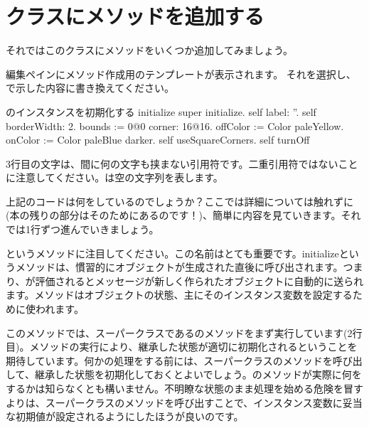 \documentclass[a4paper,10pt,twoside]{book}
\begin{document}
\section{クラスにメソッドを追加する}

それではこのクラスにメソッドをいくつか追加してみましょう。


編集ペインにメソッド作成用のテンプレートが表示されます。
それを選択し、で示した内容に書き換えてください。


\begin{numMethod}[scbecellinitialize]{のインスタンスを初期化する}
initialize
   super initialize.
   self label: ''.
   self borderWidth: 2.
   bounds := 0@0 corner: 16@16.
   offColor := Color paleYellow.
   onColor := Color paleBlue darker.
   self useSquareCorners.
   self turnOff
\end{numMethod}

\noindent
3行目の文字は、間に何の文字も挟まない引用符です。二重引用符ではないことに注意してください。は空の文字列を表します。


上記のコードは何をしているのでしょうか？ここでは詳細については触れずに(本の残りの部分はそのためにあるのです！)、簡単に内容を見ていきます。それでは1行ずつ進んでいきましょう。

というメソッドに注目してください。この名前はとても重要です。initializeというメソッドは、慣習的にオブジェクトが生成された直後に呼び出されます。つまり、が評価されるとメッセージが新しく作られたオブジェクトに自動的に送られます。メソッドはオブジェクトの状態、主にそのインスタンス変数を設定するために使われます。

このメソッドでは、スーパークラスであるのメソッドをまず実行しています(2行目)。メソッドの実行により、継承した状態が適切に初期化されるということを期待しています。何かの処理をする前には、スーパークラスのメソッドを呼び出して、継承した状態を初期化しておくとよいでしょう。のメソッドが実際に何をするかは知らなくとも構いません。不明瞭な状態のまま処理を始める危険を冒すよりは、スーパークラスのメソッドを呼び出すことで、インスタンス変数に妥当な初期値が設定されるようにしたほうが良いのです。
\end{document}
